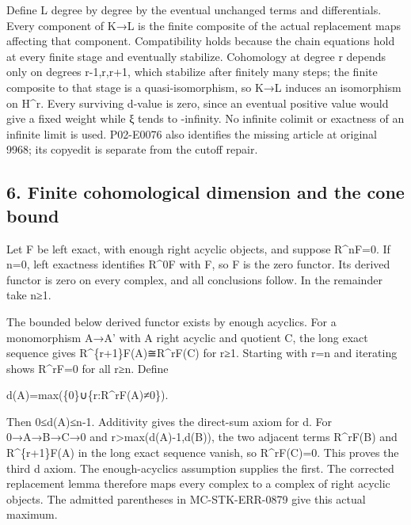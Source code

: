 \documentclass[11pt]{article}
\begin{document}
Define L degree by degree by the eventual unchanged terms and differentials. Every component of K\allowbreak{}→L is the finite composite of the actual replacement maps affecting that component. Compatibility holds because the chain equations hold at every finite stage and eventually stabilize. Cohomology at degree r depends only on degrees r-1,\allowbreak{}r,\allowbreak{}r\allowbreak{}+1,\allowbreak{} which stabilize after finitely many steps; the finite composite to that stage is a quasi-isomorphism,\allowbreak{} so K\allowbreak{}→L induces an isomorphism on H\^{}r. Every surviving d-value is zero,\allowbreak{} since an eventual positive value would give a fixed weight while ξ tends to -infinity. No infinite colimit or exactness of an infinite limit is used. P02-E0076 also identifies the missing article at original 9968; its copyedit is separate from the cutoff repair.

\subsection{6. Finite cohomological dimension and the cone bound}\label{proofs-9746-10132-finite-cohomological-dimension-and-the-cone-bound}

Let F be left exact,\allowbreak{} with enough right acyclic objects,\allowbreak{} and suppose R\textasciicircum{}nF\allowbreak{}=0. If n\allowbreak{}=0,\allowbreak{} left exactness identifies R\^{}0F with F,\allowbreak{} so F is the zero functor. Its derived functor is zero on every complex,\allowbreak{} and all conclusions follow. In the remainder take n≥1.

The bounded below derived functor exists by enough acyclics. For a monomorphism A\allowbreak{}→A' with A\textquotesingle{} right acyclic and quotient C,\allowbreak{} the long exact sequence gives R\textasciicircum{}\{r\allowbreak{}+1\}F(A)\allowbreak{}≅R\textasciicircum{}rF(C)\allowbreak{} for r≥1. Starting with r\allowbreak{}=n and iterating shows R\textasciicircum{}rF\allowbreak{}=0 for all r≥n. Define

d(A)\allowbreak{}\allowbreak{}=max(\{0\}∪\{r:\allowbreak{}R\textasciicircum{}rF(A)\allowbreak{}≠0\})\allowbreak{}.

Then 0≤d(A)\allowbreak{}≤n-1. Additivity gives the direct-sum axiom for d. For 0\allowbreak{}→A\allowbreak{}→B\allowbreak{}→C\allowbreak{}→0 and r>max(d(A)\allowbreak{}-1,\allowbreak{}d(B)\allowbreak{})\allowbreak{},\allowbreak{} the two adjacent terms R\textasciicircum{}rF(B)\allowbreak{} and R\textasciicircum{}\{r\allowbreak{}+1\}F(A)\allowbreak{} in the long exact sequence vanish,\allowbreak{} so R\textasciicircum{}rF(C)\allowbreak{}\allowbreak{}=0. This proves the third d axiom. The enough-acyclics assumption supplies the first. The corrected replacement lemma therefore maps every complex to a complex of right acyclic objects. The admitted parentheses in MC-STK-ERR-0879 give this actual maximum.
\end{document}

